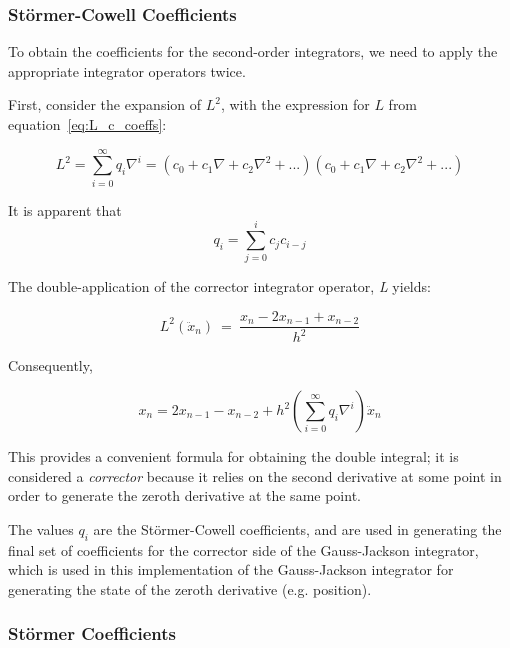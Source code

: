 \subsubsection{St\"ormer-Cowell Coefficients}

To obtain the coefficients for the second-order integrators, we need to
apply the appropriate integrator operators twice.

First, consider the expansion of $L^2$, with the expression for $L$ from 
equation~\ref{eq:L_c_coeffs}:


\begin{equation}\label{eq:L2_q_coeffs}
L^{2}=
\sum_{i=0}^{\infty }q_{i}\nabla ^{i} = 
(c_{0}+c_{1}\nabla +c_{2}\nabla ^{2}+...)(c_{0}+c_{1}\nabla +c_{2}\nabla 
^{2}+...)
\end{equation}

It is apparent that 
\begin{equation}\label{eq:stormer_q_def}
q_{i}=\sum _{j=0}^{i}c_{j}c_{i-j}
\end{equation}

The double-application of the corrector integrator operator, \textit{L} 
yields:

\begin{equation*}
L^{2}({\ddot{x}}_{n})\ =\ \frac{x_{n}-2x_{n-1}+x_{n-2}}{h^{2}}
\end{equation*}

Consequently,


\begin{equation} \label{eq:stormer_cowell}
x_{n}=2x_{n-1}-x_{n-2}+h^{2}(\sum _{i=0}^{\infty
}q_{i}\nabla ^{i})\ddot{x}_{n}
\end{equation}

This provides a convenient formula for obtaining the double integral; it
is considered a \textit{corrector} because it relies on the second derivative
at some point in order to generate the zeroth derivative at the same point.

The values $q_i$ are the St\"ormer-Cowell coefficients, and are used in
generating the final set of coefficients for the corrector side of the
Gauss-Jackson integrator, which is used in this implementation of the 
Gauss-Jackson
integrator for generating the state of the zeroth derivative (e.g. position).







\subsubsection{St\"ormer Coefficients}

